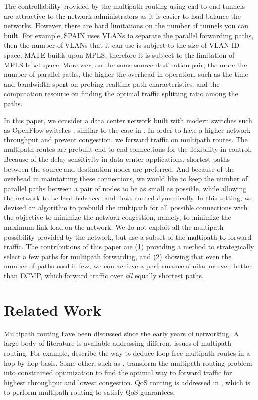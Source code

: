 \documentclass[conference]{IEEEtran}
\begin{document}
The controllability provided by the multipath routing using end-to-end tunnels
are attractive to the network administrators as it is easier to load-balance
the networks. However, there are hard limitations on the number of tunnels you
can built. For example, SPAIN \cite{myam10} uses VLANs to separate the parallel
forwarding paths, then the number of VLANs that it can use is subject to the
size of VLAN ID space; MATE \cite{ejlw01} builds upon MPLS, therefore it is
subject to the limitation of MPLS label space. Moreover, on the same
source-destination pair, the more the number of parallel paths, the higher the
overhead in operation, such as the time and bandwidth spent on probing realtime
path characteristics, and the computation resource on finding the optimal
traffic splitting ratio among the paths.

In this paper, we consider a data center network built with modern switches
such as OpenFlow switches \cite{mabpprst08}, similar to the case in
\cite{baaz10}. In order to have a higher network throughput and prevent
congestion, we forward traffic on multipath routes. The multipath routes are
prebuilt end-to-end connections for the flexibility in control. Because of the
delay sensitivity in data center applications, shortest paths between the
source and destination nodes are preferred. And because of the overhead in
maintaining these connections, we would like to keep the number of parallel
paths between a pair of nodes to be as small as possible, while allowing the
network to be load-balanced and flows routed dynamically. In this setting, we
devised an algorithm to prebuild the multipath for all possible connections
with the objective to minimize the network congestion, namely, to minimize the
maximum link load on the network. We do not exploit all the multipath
possibility provided by the network, but use a subset of the multipath to
forward traffic. The contributions of this paper are (1) providing a method to
strategically select a few paths for multipath forwarding, and (2) showing that
even the number of paths used is few, we can achieve a performance similar or
even better than ECMP, which forward traffic over \emph{all} equally shortest
paths.

\section{Related Work}\label{sec:related}

Multipath routing have been discussed since the early years of networking. A
large body of literature is available addressing different issues of multipath
routing. For example, \cite{ns99,vg00,vg01,mpc08} describe the way to deduce
loop-free multipath routes in a hop-by-hop basis. Some other, such as
\cite{ft00,bo07}, transform the multipath routing problem into constrained
optimization to find the optimal way to forward traffic for highest throughput
and lowest congestion. QoS routing is addressed in
\cite{wc96,ms97,rfc2386,cn98,jng01}, which is to perform multipath routing to
satisfy QoS guarantees.
\end{document}
